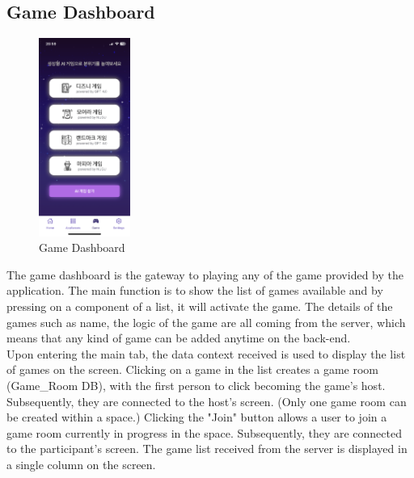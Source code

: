 \documentclass[conference]{IEEEtran}
\begin{document}
    \subsection{Game Dashboard}
        \begin{figure}[htbp]
            \centerline{\includegraphics[width=3cm]{Images/screen/game/GAME_LIST.PNG}}
            \caption{Game Dashboard}
            \label{fig}
        \end{figure}
        The game dashboard is the gateway to playing any of the game provided by the application. The main function is to show the list of games available and by pressing on a component of a list, it will activate the game. The details of the games such as name, the logic of the game are all coming from the server, which means that any kind of game can be added anytime on the back-end.\\
        Upon entering the main tab, the data context received is used to display the list of games on the screen. Clicking on a game in the list creates a game room (Game\_Room DB), with the first person to click becoming the game's host. Subsequently, they are connected to the host's screen. (Only one game room can be created within a space.) Clicking the "Join" button allows a user to join a game room currently in progress in the space. Subsequently, they are connected to the participant's screen. The game list received from the server is displayed in a single column on the screen.
\end{document}
